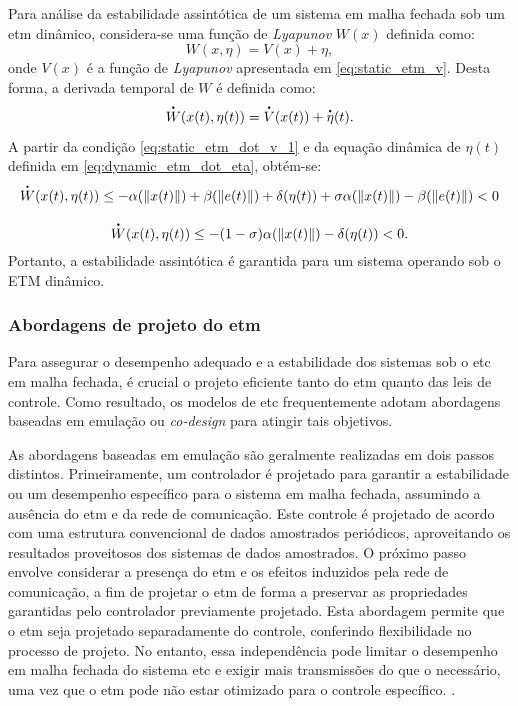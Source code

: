 Para análise da estabilidade assintótica de um sistema em malha fechada sob um \acrshort{etm} dinâmico, considera-se uma função de \textit{Lyapunov }$W(x)$ definida como: \begin{equation}
  W(x, \eta) = V(x) + \eta,
\end{equation} onde $V(x)$ é a função de \textit{Lyapunov }apresentada em \eqref{eq:static_etm_v}. Desta forma, a derivada temporal de $W$ é definida como: \begin{equation}
  \dt{W}(x(t), \eta(t)) = \dt{V}(x(t)) + \dt{\eta}(t).
\end{equation} A partir da condição \eqref{eq:static_etm_dot_v_1} e da equação dinâmica de $\eta(t)$ definida em \eqref{eq:dynamic_etm_dot_eta}, obtém-se: \begin{gather}
  \dt{W}(x(t), \eta(t)) \leq - \alpha(\|x(t)\|) + \beta(\|e(t)\|) + \delta(\eta(t)) + \sigma \alpha(\|x(t)\|) - \beta(\|e(t)\|) < 0\\[8pt]
  \dt{W}(x(t), \eta(t)) \leq - (1 - \sigma)\alpha(\|x(t)\|) - \delta(\eta(t)) < 0.
\end{gather} Portanto, a estabilidade assintótica é garantida para um sistema operando sob o ETM dinâmico.

\subsubsection{Abordagens de projeto do \acrshort{etm}}

Para assegurar o desempenho adequado e a estabilidade dos sistemas sob o \acrshort{etc} em malha fechada, é crucial o projeto eficiente tanto do \acrshort{etm} quanto das leis de controle. Como resultado, os modelos de \acrshort{etc} frequentemente adotam abordagens baseadas em emulação ou \textit{co-design} para atingir tais objetivos. 

As abordagens baseadas em emulação são geralmente realizadas em dois passos distintos. Primeiramente, um controlador é projetado para garantir a estabilidade ou um desempenho específico para o sistema em malha fechada, assumindo a ausência do \acrshort{etm} e da rede de comunicação. Este controle é projetado de acordo com uma estrutura convencional de dados amostrados periódicos, aproveitando os resultados proveitosos dos sistemas de dados amostrados. O próximo passo envolve considerar a presença do \acrshort{etm} e os efeitos induzidos pela rede de comunicação, a fim de projetar o \acrshort{etm} de forma a preservar as propriedades garantidas pelo controlador previamente projetado. Esta abordagem permite que o \acrshort{etm} seja projetado separadamente do controle, conferindo flexibilidade no processo de projeto. No entanto, essa independência pode limitar o desempenho em malha fechada do sistema \acrshort{etc} e exigir mais transmissões do que o necessário, uma vez que o \acrshort{etm} pode não estar otimizado para o controle específico. \citep{coutinho2021,peng2018}.

